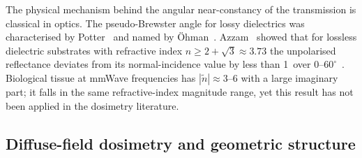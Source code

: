 \documentclass[11pt,a4paper]{article}
\theoremstyle{definition}      %
\newcommand{\ntilde}{\tilde{n}}
\begin{document}
The physical mechanism behind the angular near-constancy of the
transmission is classical in optics.
The pseudo-Brewster angle for lossy dielectrics was characterised by
Potter~\cite{Potter1970} and named by
\"{O}hman~\cite{Ohman1977}.
Azzam~\cite{Azzam2015} showed that for lossless dielectric substrates
with refractive index $n \ge 2+\sqrt{3} \approx 3.73$ the unpolarised
reflectance deviates from its normal-incidence value by less than 1\,%
over $0$--$60^\circ$~\cite{BornWolf1999}.
Biological tissue at mmWave frequencies has $|\ntilde| \approx 3$--6
with a large imaginary part; it falls in the same refractive-index
magnitude range, yet this result has not been applied in the dosimetry
literature.

\subsection{Diffuse-field dosimetry and geometric structure}
\end{document}
